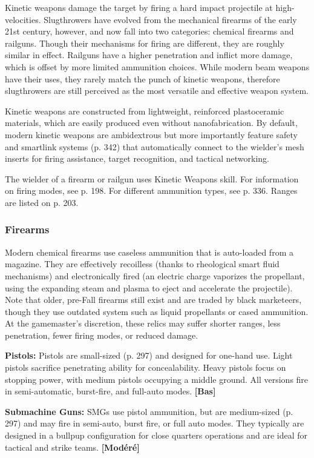 {{Kinetic weapons damage the target by firing a hard impact projectile at high-velocities. Slugthrowers have evolved from the mechanical firearms of the early 21st century, however, and now fall into two categories: chemical firearms and railguns. Though their mechanisms for firing are different, they are roughly similar in effect. Railguns have a higher penetration and inflict more damage, which is offset by more limited ammunition choices. While modern beam weapons have their uses, they rarely match the punch of kinetic weapons, therefore slugthrowers are still perceived as the most versatile and effective weapon system. 

Kinetic weapons are constructed from lightweight, reinforced plastoceramic materials, which are easily produced even without nanofabrication. By default, modern kinetic weapons are ambidextrous but more importantly feature safety and smartlink systems (p. 342) that automatically connect to the wielder’s mesh inserts for firing assistance, target recognition, and tactical networking. 

The wielder of a firearm or railgun uses Kinetic Weapons skill. For information on firing modes, see p. 198. For different ammunition types, see p. 336. Ranges are listed on p. 203. 

\subsubsection{Firearms} 

Modern chemical firearms use caseless ammunition that is auto-loaded from a magazine. They are effectively recoilless (thanks to rheological smart fluid mechanisms) and electronically fired (an electric charge vaporizes the propellant, using the expanding steam and plasma to eject and accelerate the projectile). Note that older, pre-Fall firearms still exist and are traded by black marketeers, though they use outdated system such as liquid propellants or cased ammunition. At the gamemaster’s discretion, these relics may suffer shorter ranges, less penetration, fewer firing modes, or reduced damage. 

\textbf{Pistols:} Pistols are small-sized (p. 297) and designed for one-hand use. Light pistols sacrifice penetrating ability for concealability. Heavy pistols focus on stopping power, with medium pistols occupying a middle ground. All versions fire in semi-automatic, burst-fire, and full-auto modes. \textbf{[Bas]} 

\textbf{Submachine Guns:} SMGs use pistol ammunition, but are medium-sized (p. 297) and may fire in semi-auto, burst fire, or full auto modes. They typically are designed in a bullpup configuration for close quarters operations and are ideal for tactical and strike teams. \textbf{[Modéré]} 

}}
